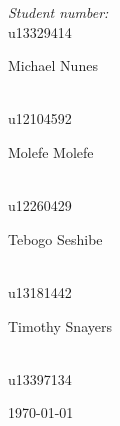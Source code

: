 \documentclass[a4paper,12pt]{report}
\begin{document}
\begin{titlepage}
\begin{center}
\begin{minipage}{0.4\textwidth}
\end{minipage}
\begin{minipage}{0.4\textwidth}
\begin{flushright} \large
\emph{Student number:} \\
u13329414
\end{flushright}
\end{minipage}
\begin{minipage}{0.4\textwidth}
\begin{flushleft} \large
Michael {Nunes}
\end{flushleft}
\end{minipage}
\begin{minipage}{0.4\textwidth}
\begin{flushright} \large
\emph{} \\
u12104592
\end{flushright}
\end{minipage}
\begin{minipage}{0.4\textwidth}
\begin{flushleft} \large
Molefe {Molefe}
\end{flushleft}
\end{minipage}
\begin{minipage}{0.4\textwidth}
\begin{flushright} \large
\emph{} \\
u12260429
\end{flushright}
\end{minipage}
\begin{minipage}{0.4\textwidth}
\begin{flushleft} \large
Tebogo {Seshibe}
\end{flushleft}
\end{minipage}
\begin{minipage}{0.4\textwidth}
\begin{flushright} \large
\emph{} \\
u13181442
\end{flushright}
\end{minipage}
\begin{minipage}{0.4\textwidth}
\begin{flushleft} \large
Timothy {Snayers}
\end{flushleft}
\end{minipage}
\begin{minipage}{0.4\textwidth}
\begin{flushright} \large
\emph{} \\
u13397134
\end{flushright}
\end{minipage}
\vfill
{\large \today}
\end{center}
\end{titlepage}
\footnotesize
%
\normalsize
\end{document}
